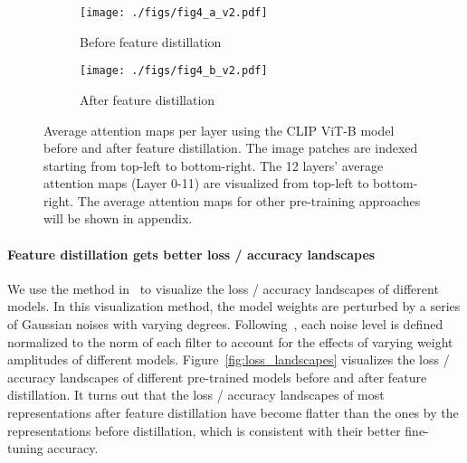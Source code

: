 \documentclass{article}
\begin{document}
\begin{figure}
\centering
\begin{subfigure}{.5\textwidth}
  \centering
  \texttt{[image: ./figs/fig4\_a\_v2.pdf]}
  \caption{Before feature distillation}
  \label{fig:att_patterns_a}
\end{subfigure}\begin{subfigure}{.5\textwidth}
  \centering
  \texttt{[image: ./figs/fig4\_b\_v2.pdf]}
  \caption{After feature distillation}
  \label{fig:att_patterns_b}
\end{subfigure}
    \caption{Average attention maps per layer using the CLIP ViT-B model before and after feature distillation. The image patches are indexed starting from top-left to bottom-right. The 12 layers' average attention maps (Layer 0-11) are visualized from top-left to bottom-right. The average attention maps for other pre-training approaches will be shown in appendix.}
    \label{fig:att_patterns}
\end{figure}

\paragraph{Feature distillation gets better loss / accuracy landscapes} We use the method in~\cite{losslandscape2017} to visualize the loss / accuracy landscapes of different models. In this visualization method, the model weights are perturbed by a series of Gaussian noises with varying degrees. Following~\cite{losslandscape2017}, each noise level is defined normalized to the  norm of each filter to account for the effects of varying weight amplitudes of different models. Figure~\ref{fig:loss_landscapes} visualizes the loss / accuracy landscapes of different pre-trained models before and after feature distillation. It turns out that the loss / accuracy landscapes of most representations after feature distillation have become flatter than the ones by the representations before distillation, which is consistent with their better fine-tuning accuracy. 
\end{document}
